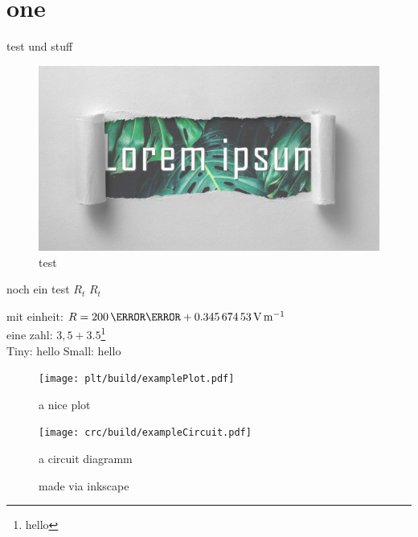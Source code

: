 \documentclass[twoside,f1]{HsH-report}
\begin{document}
\maketitle
\declarationAuthorship

\begin{abstract}
	\lipsum[5-8]
\end{abstract}

\tableofcontents

\cleardoublepage %

\chapter{one}
	\label{chap: one}
	{\color{red}test} und stuff
	\begin{figure}
		\centering
		\includegraphics[width=.6\textwidth]{img/lorem-ipsum.jpg}
		\caption{test}
	\end{figure}

	noch ein test \normalsubscripts$R_t$ \upsubscripts$R_t$

	mit einheit: $R=200\,\milli\ohm+ \SI{0.34567453}{\volt\per\metre}$
	\cite{laboranleitung:physik}
	\vspace{2cm}\\
	eine zahl: $3,5+3.5$\footnote[1]{hello}\\

	Tiny: {\tiny hello} Small: {\small hello}

	\lipsum[5-6]

	\pagebreak
	\begin{figure}
		\centering
		\texttt{[image: plt/build/examplePlot.pdf]}
		\caption{a nice plot}
	\end{figure}

	\begin{figure}
		\centering
		\texttt{[image: crc/build/exampleCircuit.pdf]}
		\caption{a circuit diagramm}
	\end{figure}

	\makeatletter
	\g@addto@macro\@floatboxreset\raggedright %

	\begin{figure}
		\graphicspath{{svg/build/}} %
		
		\caption{made via inkscape}
	\end{figure}

\printbibliography
\listoffigures
\end{document}
